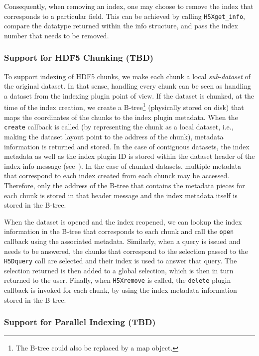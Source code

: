 Consequently, when removing an index, one may choose to remove the index that
corresponds to a particular field. This can be achieved by calling \texttt{H5Xget\_info},
compare the datatype returned within the info structure, and pass the index number
that needs to be removed.

\subsubsection{Support for HDF5 Chunking (TBD)}

To support indexing of HDF5 chunks, we make each chunk a local \textit{sub-dataset}
of the original dataset. In that sense, handling every chunk can be seen as handling
a dataset from the indexing plugin point of view. If the dataset is chunked,
at the time of the index creation, we create a B-tree\footnote{The B-tree could also
be replaced by a map object.} (physically
stored on disk) that maps the coordinates of the chunks to the index plugin metadata.
When the \texttt{create} callback is called (by representing the chunk as
a local dataset, i.e., making the dataset layout point to the address of the chunk),
metadata information is returned and stored.
In the case of contiguous datasets, the index metadata as well as the index plugin ID is
stored within the dataset header of the index info message (see~).
In the case of chunked datasets, multiple metadata that correspond to each index created
from each chunck may be accessed. Therefore, only the address of the B-tree that contains the 
metadata pieces for each chunk is stored in that header message and the index
metadata itself is stored in the B-tree.

When the dataset is opened and the index reopened, we can lookup the index
information in the B-tree that corresponds to each chunk and call the \texttt{open}
callback using the associated metadata.
Similarly, when a query is issued and needs to be answered, the chunks that
correspond to the selection passed to the \texttt{H5Dquery} call are selected
and their index is used to answer that query. The selection returned is then
added to a global selection, which is then in turn returned to the user.
Finally, when \texttt{H5Xremove} is called, the \texttt{delete} plugin callback is
invoked for each chunk, by using the index metadata information stored in the B-tree.

\subsubsection{Support for Parallel Indexing (TBD)}

